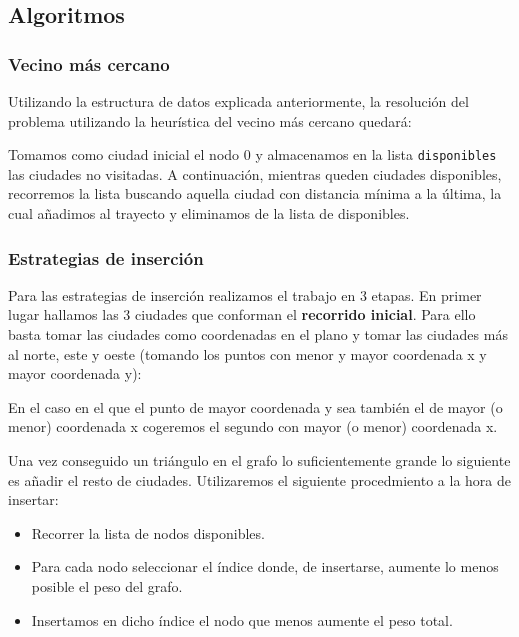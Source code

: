 \subsection{Algoritmos}

\subsubsection{Vecino más cercano}

Utilizando la estructura de datos explicada anteriormente, la resolución del problema
utilizando la heurística del vecino más cercano quedará:



Tomamos como ciudad inicial el nodo 0 y almacenamos en la lista \texttt{disponibles}
las ciudades no visitadas. A continuación, mientras queden ciudades disponibles,
recorremos la lista buscando aquella ciudad con distancia mínima a la última, la
cual añadimos al trayecto y eliminamos de la lista de disponibles.

\newpage

\subsubsection{Estrategias de inserción}

Para las estrategias de inserción realizamos el trabajo en 3 etapas.
En primer lugar hallamos las 3 ciudades que conforman el \textbf{recorrido inicial}.
Para ello basta tomar las ciudades como coordenadas en el plano y tomar las ciudades
más al norte, este y oeste (tomando los puntos con menor y mayor coordenada x y mayor
coordenada y):



En el caso en el que el punto de mayor coordenada y sea también el de mayor (o menor)
coordenada x cogeremos el segundo con mayor (o menor) coordenada x.

Una vez conseguido un triángulo en el grafo lo suficientemente grande lo siguiente es añadir el resto de ciudades. Utilizaremos el siguiente procedmiento a la hora de insertar:

\begin{itemize}
  \item Recorrer la lista de nodos disponibles.
  \item Para cada nodo seleccionar el índice donde, de insertarse, aumente lo menos posible el peso del grafo.
  \item Insertamos en dicho índice el nodo que menos aumente el peso total.
\end{itemize}

